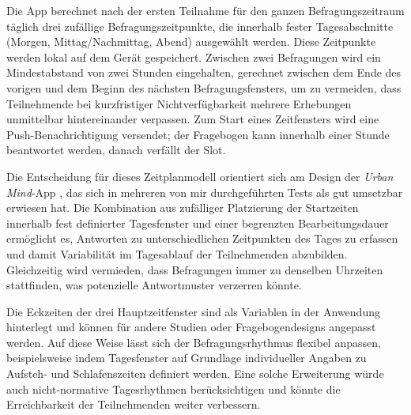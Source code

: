 Die App berechnet nach der ersten Teilnahme für den ganzen Befragungszeitraum täglich drei zufällige Befragungszeitpunkte, die innerhalb fester Tagesabschnitte (Morgen, Mittag/Nachmittag, Abend) ausgewählt werden. Diese Zeitpunkte werden lokal auf dem Gerät gespeichert. Zwischen zwei Befragungen wird ein Mindestabstand von zwei Stunden eingehalten, gerechnet zwischen dem Ende des vorigen und dem Beginn des nächsten Befragungsfensters, um zu vermeiden, dass Teilnehmende bei kurzfristiger Nichtverfügbarkeit mehrere Erhebungen unmittelbar hintereinander verpassen. Zum Start eines Zeitfensters wird eine Push-Benachrichtigung versendet; der Fragebogen kann innerhalb einer Stunde beantwortet werden, danach verfällt der Slot.

Die Entscheidung für dieses Zeitplanmodell orientiert sich am Design der \textit{Urban Mind}-App \parencite{bakolisUrbanMindUsing2018}, das sich in mehreren von mir durchgeführten Tests als gut umsetzbar erwiesen hat. Die Kombination aus zufälliger Platzierung der Startzeiten innerhalb fest definierter Tagesfenster und einer begrenzten Bearbeitungsdauer ermöglicht es, Antworten zu unterschiedlichen Zeitpunkten des Tages zu erfassen und damit Variabilität im Tagesablauf der Teilnehmenden abzubilden. Gleichzeitig wird vermieden, dass Befragungen immer zu denselben Uhrzeiten stattfinden, was potenzielle Antwortmuster verzerren könnte.

Die Eckzeiten der drei Hauptzeitfenster sind als Variablen in der Anwendung hinterlegt und können für andere Studien oder Fragebogendesigns angepasst werden. Auf diese Weise lässt sich der Befragungsrhythmus flexibel anpassen, beispielsweise indem Tagesfenster auf Grundlage individueller Angaben zu Aufsteh- und Schlafenszeiten definiert werden. Eine solche Erweiterung würde auch nicht-normative Tagesrhythmen berücksichtigen und könnte die Erreichbarkeit der Teilnehmenden weiter verbessern.

